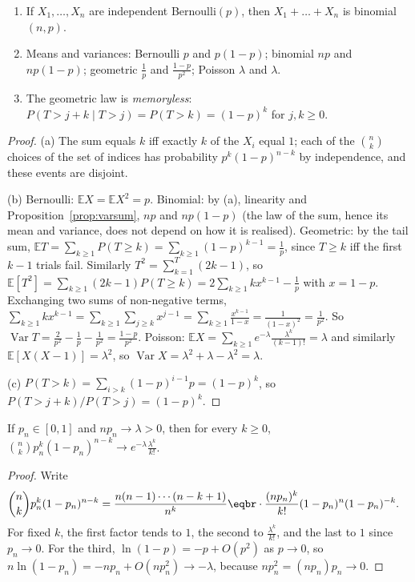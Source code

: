\begin{proposition}\label{prop:laws}
\begin{enumerate}[label=(\alph*)]
\item If $X_1,\dots,X_n$ are independent Bernoulli$(p)$, then $X_1+\dots+X_n$ is binomial$(n,p)$.
\item Means and variances: Bernoulli $p$ and $p(1-p)$; binomial $np$ and $np(1-p)$; geometric $\frac1p$ and $\frac{1-p}{p^2}$;
Poisson $\lambda$ and $\lambda$.
\item The geometric law is \emph{memoryless}: $P(T>j+k\mid T>j)=P(T>k)=(1-p)^k$ for $j,k\ge0$.
\end{enumerate}
\end{proposition}
\begin{proof}
(a) The sum equals $k$ iff exactly $k$ of the $X_i$ equal $1$; each of the $\binom nk$ choices of the set of indices has
probability $p^k(1-p)^{n-k}$ by independence, and these events are disjoint.

(b) Bernoulli: $\mathbb E X=\mathbb E X^2=p$. Binomial: by (a), linearity and Proposition~\ref{prop:varsum}, $np$ and $np(1-p)$ (the law
of the sum, hence its mean and variance, does not depend on how it is realised). Geometric: by the tail sum,
$\mathbb E T=\sum_{k\ge1}P(T\ge k)=\sum_{k\ge1}(1-p)^{k-1}=\frac1p$, since $T\ge k$ iff the first $k-1$ trials fail. Similarly
$T^2=\sum_{k=1}^T(2k-1)$, so $\mathbb E[T^2]=\sum_{k\ge1}(2k-1)P(T\ge k)=2\sum_{k\ge1}kx^{k-1}-\frac1p$ with $x=1-p$. Exchanging two sums
of non-negative terms, $\sum_{k\ge1}kx^{k-1}=\sum_{k\ge1}\sum_{j\ge k}x^{j-1}=\sum_{k\ge1}\frac{x^{k-1}}{1-x}=\frac1{(1-x)^2}=\frac1{p^2}$. So
$\operatorname{Var}T=\frac2{p^2}-\frac1p-\frac1{p^2}=\frac{1-p}{p^2}$. Poisson:
$\mathbb E X=\sum_{k\ge1}e^{-\lambda}\frac{\lambda^k}{(k-1)!}=\lambda$ and similarly $\mathbb E[X(X-1)]=\lambda^2$, so $\operatorname{Var}X=\lambda^2+\lambda-\lambda^2=\lambda$.

(c) $P(T>k)=\sum_{i>k}(1-p)^{i-1}p=(1-p)^k$, so $P(T>j+k)/P(T>j)=(1-p)^k$.
\end{proof}

\begin{theorem}\label{thm:poissonlimit}
If $p_n\in[0,1]$ and $np_n\to\lambda>0$, then for every $k\ge0$, $\binom nkp_n^k(1-p_n)^{n-k}\to e^{-\lambda}\frac{\lambda^k}{k!}$.
\end{theorem}
\begin{proof}
Write
\[
\begin{aligned}\binom nkp_n^k(1-p_n)^{n-k}&=\frac{n(n-1)\cdots(n-k+1)}{n^k}\eqbr\cdot\frac{(np_n)^k}{k!}(1-p_n)^{n}(1-p_n)^{-k}.\end{aligned}
\]
For fixed $k$, the first factor tends to $1$, the second to $\frac{\lambda^k}{k!}$, and the last to $1$ since $p_n\to0$. For
the third, $\ln(1-p)=-p+O(p^2)$ as $p\to0$, so $n\ln(1-p_n)=-np_n+O(np_n^2)\to-\lambda$, because $np_n^2=(np_n)p_n\to0$.
\end{proof}

